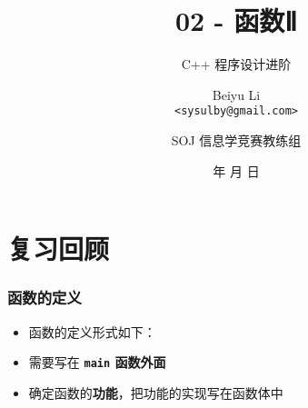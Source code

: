 \title[02 - 函数Ⅱ]
{02 - 函数Ⅱ}

\subtitle{C++ 程序设计进阶}

\author[Beiyu Li]
{Beiyu Li\\
\texttt{<sysulby@gmail.com>}}


\date[\today]
{\number\year 年 \number\month 月 \number\day 日}




\author[sysulby]
{SOJ 信息学竞赛教练组}

\begin{frame}
    \titlepage
\end{frame}
\setcounter{framenumber}{0} %

\section{复习回顾}


\begin{frame}[fragile]
    \frametitle{函数的定义}

    \begin{itemize}[<+->]
        \item 函数的定义形式如下：
        
        \item 需要写在 \textbf{\lstinline|main| 函数外面}
        \item 确定函数的\textbf{功能}，把功能的实现写在函数体中
    \end{itemize}
\end{frame}

